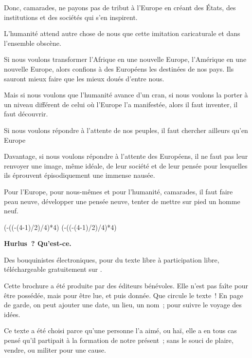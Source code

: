 \documentclass[french,twoside]{book} %
\newcommand\chapterclose{} %
\def\truncdiv#1#2{((#1-(#2-1)/2)/#2)}
\def\moduloop#1#2{(#1-\truncdiv{#1}{#2}*#2)}
\def\modulo#1#2{\number\numexpr\moduloop{#1}{#2}\relax}
\begin{document}
Donc, camarades, ne payons pas de tribut à l’Europe en créant des États, des institutions et des sociétés qui s’en inspirent.\par
L’humanité attend autre chose de nous que cette imitation caricaturale et dans l’ensemble obscène.\par
 Si nous voulons transformer l’Afrique en une nouvelle Europe, l’Amérique en une nouvelle Europe, alors confions à des Européens les destinées de nos pays. Ils sauront mieux faire que les mieux doués d’entre nous.\par
Mais si nous voulons que l’humanité avance d’un cran, si nous voulons la porter à un niveau différent de celui où l’Europe l’a manifestée, alors il faut inventer, il faut découvrir.\par
Si nous voulons répondre à l’attente de nos peuples, il faut chercher ailleurs qu’en Europe\par
Davantage, si nous voulons répondre à l’attente des Européens, il ne faut pas leur renvoyer une image, même idéale, de leur société et de leur pensée pour lesquelles ils éprouvent épisodiquement une immense nausée.\par
Pour l’Europe, pour nous-mêmes et pour l’humanité, camarades, il faut faire peau neuve, développer une pensée neuve, tenter de mettre sur pied un homme neuf.
\chapterclose

 


\ifbooklet
  \pagestyle{empty}
  \clearpage
  \ifnum\modulo{\value{page}}{4}=0 \hbox{}\newpage\hbox{}\newpage\fi
  \ifnum\modulo{\value{page}}{4}=1 \hbox{}\newpage\hbox{}\newpage\fi


  \hbox{}\newpage
  \ifodd\value{page}\hbox{}\newpage\fi
  {\centering\color{rubric}\bfseries\noindent\large
    Hurlus ? Qu’est-ce.\par
    \bigskip
  }
  \noindent Des bouquinistes électroniques, pour du texte libre à participation libre,
  téléchargeable gratuitement sur \href{https://hurlus.fr}{}.\par
  \bigskip
  \noindent Cette brochure a été produite par des éditeurs bénévoles.
  Elle n’est pas faîte pour être possédée, mais pour être lue, et puis donnée.
  Que circule le texte !
  En page de garde, on peut ajouter une date, un lieu, un nom ; pour suivre le voyage des idées.
  \par

  Ce texte a été choisi parce qu’une personne l’a aimé,
  ou haï, elle a en tous cas pensé qu’il partipait à la formation de notre présent ;
  sans le souci de plaire, vendre, ou militer pour une cause.
  \par
\end{document}

